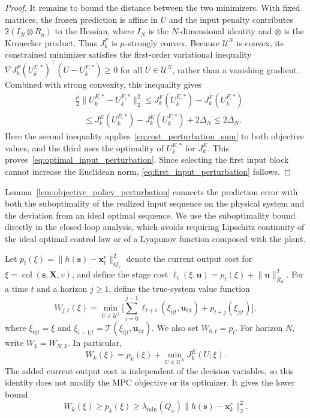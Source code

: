 \documentclass[journal]{IEEEtran}
\newcommand{\vx}{\mathbf{x}}
\newcommand{\vu}{\mathbf{u}}
\newcommand{\vs}{\mathbf{s}}
\newcommand{\mX}{\mathbf{X}}
\newcommand{\norm}[2][]{\mathopen{#1\lVert}#2\mathclose{#1\rVert}}
\newcommand{\col}{\operatorname{col}}
\theoremstyle{plain}
\theoremstyle{definition}
\theoremstyle{definition}
\begin{document}
\begin{proof}
It remains to bound the distance between the two minimizers. With
fixed matrices, the frozen prediction is affine in $U$ and the
input penalty contributes $2(I_N\otimes R_u)$ to the Hessian, where
$I_N$ is the $N$-dimensional identity and $\otimes$ is the Kronecker
product. Thus $J_k^F$ is
$\mu$-strongly convex. Because $\mathcal U^N$ is convex, its
constrained minimizer satisfies the first-order variational inequality
$\nabla J_k^F(U_k^{F,*})^\top(U-U_k^{F,*})\ge0$ for all
$U\in\mathcal U^N$, rather than a vanishing gradient. Combined with
strong convexity, this inequality gives
\begin{equation}
\begin{aligned}
&\frac{\mu}{2}\norm{U_k^{E,*}-U_k^{F,*}}_2^2
\le J_k^F(U_k^{E,*})-J_k^F(U_k^{F,*})\\
&\quad\le J_k^E(U_k^{E,*})-J_k^E(U_k^{F,*})+2\bar\Delta_N
\le2\bar\Delta_N.
\end{aligned}
\label{eq:strong_convexity_gap}
\end{equation}
Here the second inequality applies~\eqref{eq:cost_perturbation_sum} to
both objective values, and the third uses the optimality of
$U_k^{E,*}$ for $J_k^E$. This
proves~\eqref{eq:optimal_input_perturbation}. Since selecting the
first input block cannot increase the Euclidean norm,
\eqref{eq:first_input_perturbation} follows.
\end{proof}

Lemma~\ref{lem:objective_policy_perturbation} connects the prediction
error with both the suboptimality of the realized input sequence on
the physical system and the deviation from an ideal optimal sequence.
We use the suboptimality bound directly in the closed-loop analysis,
which avoids requiring Lipschitz continuity of the ideal optimal
control law or of a Lyapunov function composed with the plant.

Let $p_t(\xi)=\norm{h(\vs)-\vx_t^r}_{Q_x}^2$ denote the current
output cost for $\xi=\col(\vs,\mX,v)$, and define the stage cost
$\ell_t(\xi,\vu)=p_t(\xi)+\norm{\vu}_{R_u}^2$. For a time $t$ and
a horizon $j\ge1$, define the true-system value function
\begin{equation}
W_{j,t}(\xi)=\min_{U\in\mathcal U^j}\bigg[\sum_{i=0}^{j-1}
\ell_{t+i}(\xi_{i|t},\vu_{i|t})+p_{t+j}(\xi_{j|t})\bigg],
\label{eq:ideal_value_function}
\end{equation}
where $\xi_{0|t}=\xi$ and
$\xi_{i+1|t}=\mathcal T(\xi_{i|t},\vu_{i|t})$. We also set
$W_{0,t}=p_t$. For horizon $N$, write $W_k=W_{N,k}$. In particular,
\begin{equation}
W_k(\xi)=p_k(\xi)+\min_{U\in\mathcal U^N}J_k^E(U;\xi).
\label{eq:corrected_value_function}
\end{equation}
The added current output cost is independent of the decision variables,
so this identity does not modify the MPC objective or its optimizer.
It gives the lower bound
\begin{equation}
W_k(\xi)\ge p_k(\xi)\ge\lambda_{\min}(Q_x)
\norm{h(\vs)-\vx_k^r}_2^2.
\label{eq:lyapunov_output_lower_bound}
\end{equation}
\end{document}
